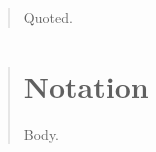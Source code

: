 \documentclass{article}
\begin{document}
\begin{quote}
\noindent Quoted.
\end{quote}
\begin{quote}
\begin{minipage}{0.8\linewidth}
\tableofcontents
\end{minipage}
\end{quote}
\begin{quote}
\begin{minipage}{\linewidth}
\section*{Notation}
Body.
\end{minipage}
\end{quote}
\end{document}
